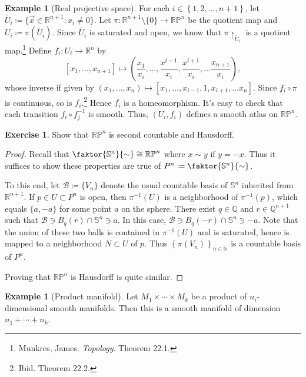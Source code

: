 \documentclass[10pt,letterpaper,cm]{nupset}
\theoremstyle{definition}
\newtheorem{exmp}[definition]{Example}
\theoremstyle{theorem}
\newtheorem{exercise}[definition]{Exercise}
\theoremstyle{remark}
\newcommand{\N}{\mathbb N}
\newcommand{\Q}{\mathbb Q}
\newcommand{\R}{\mathbb R}
\newcommand{\RP}{\mathbb{RP}}
\renewcommand{\S}{\mathbb S}
\newcommand{\1}{\mathbf{1}}
\newcommand{\x}{\vec x}
\newcommand{\0}{\vec 0}
\begin{document}
\begin{exmp}[Real projective space]
 For each $i \in \left\{1, 2, \ldots, n+1\right\}$, let $\tilde{U_i}\coloneqq  \{\x \in \R^{n+1} : x_i \ne 0\}$. Let $\pi: \R^{n+1} \setminus\{0\} \to \RP^n$ be the quotient map and $U_i \coloneqq  \pi\left(\tilde{U_i}\right)$. Since $\tilde{U_i}$ is saturated and open, we know that $\pi \restriction_{\tilde{U_i}}$ is a quotient map.\footnote{Munkres, James. \textit{Topology}. Theorem 22.1.} Define $f_i : U_i \to \R^n$ by $$\left[x_1, \ldots, x_{n+1}\right] \mapsto \left(\frac{x_1}{x_i}, \ldots, \frac{x^{i-1}}{x_i}, \frac{x^{i+1}}{x_i}, \ldots \frac{x_{n+1}}{x_i}\right),$$ whose inverse if given by $\left(x_1, \ldots, x_n\right) \mapsto \left[x_1, \ldots, x_{i-1}, 1, x_{i+1}, \ldots x_n\right]$. Since $f_i \circ \pi$ is continuous, so is $f_i$.\footnote{Ibid. Theorem 22.2.} Hence $f_i$ is a homeomorphism. It's easy to check that each transition $f_i \circ f_j^{-1}$ is smooth. Thus, $(U_i, f_i)$ defines a smooth atlas on $\RP^n$.
\end{exmp}

\begin{exercise} 
Show that $\RP^n$ is second countable and Hausdorff. 
\end{exercise}
\begin{proof}
Recall that $\faktor{\S^n}{\sim} \cong \RP^n$ where $x \sim y$ if $y = {-x}$. Thus it suffices to show these properties are true of $P^n\coloneqq  \faktor{\S^n}{\sim}$. 

\smallskip


To this end, let $\mathcal{B}\coloneqq \{V_n\}$ denote the usual countable basis of $\S^n$ inherited from $\R^{n+1}$. If $p\in U\subset P^n$ is open, then $\pi^{-1}(U)$ is a neighborhood of $\pi^{-1}(p)$, which equals $\{a, -a\}$ for some point $a$ on the sphere.  There exist $q\in \Q$ and $r \in \Q^{n+1}$ such that $\mathcal{B} \ni B_q(r) \cap \S^n \ni a$. In this case, $\mathcal{B} \ni B_q({-r}) \cap \S^n \ni -a$. Note that the union of these two balls is contained in $\pi^{-1}(U)$ and is saturated, hence is mapped to a neighborhood $N \subset U$ of $p$. Thus $\left\{\pi(V_n)\right\}_{n\in \N}$  is a countable basis of $P^n$.

\smallskip

 Proving that $\RP^n$ is Hausdorff is quite similar.
\end{proof}

\begin{exmp}[Product manifold]

Let $M_1 \times \cdots \times M_k$ be a product of $n_i$-dimensional smooth manifolds. Then this is a smooth manifold of dimension $n_1 + \cdots + n_k$.

\end{exmp}
\end{document}
